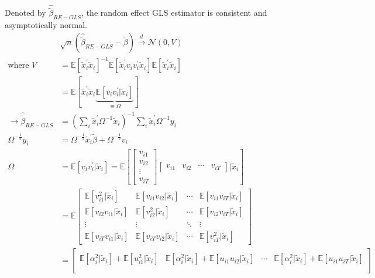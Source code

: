 Denoted by $\hat{\tilde{\beta}}_{RE-GLS} $, the random effect GLS estimator is consistent and asymptotically normal.
\begin{align*}
    &\sqrt{n} \left( \hat{\tilde{\beta}}_{RE-GLS} - \tilde{\beta} \right) \overset{d}{\rightarrow} \mathcal{N}\left(0, V \right) \\
    \text{where } V &= \mathbb{E}\left[\tilde{x}_i^{\prime} \tilde{x}_i \right]^{-1} \mathbb{E}\left[\tilde{x}_i^{\prime} v_i v_i^{\prime} \tilde{x}_i \right] \mathbb{E}\left[\tilde{x}_i^{\prime} \tilde{x}_i \right] \\
    &= \mathbb{E}\left[\tilde{x}_i^{\prime} \tilde{x}_i \underset{\equiv \Omega}{\underbrace{\mathbb{E}[v_i v_i^{\prime} | \tilde{x}_i]}}\right] \\
    \rightarrow \hat{\tilde{\beta}}_{RE-GLS} &= \left( \sum_i \tilde{x}_i^{\prime} \Omega^{-1} \tilde{x}_i \right)^{-1} \sum_i \tilde{x}_i^{\prime} \Omega^{-1} y_i \\
    \Omega ^{-\frac{1}{2}} y_i &= \Omega ^{-\frac{1}{2}} \tilde{x}_i^{\prime} \tilde{\beta} + \Omega^{-\frac{1}{2}}v_i \\
    \Omega &= \mathbb{E}[v_i v_i^{\prime} | \tilde{x}_i] = \mathbb{E}\left[ \begin{bmatrix}
        v_{i1} \\
        v_{i2} \\
        \vdots \\
        v_{iT}
    \end{bmatrix} \begin{bmatrix}
        v_{i1} & v_{i2} & \cdots & v_{iT}
    \end{bmatrix} | \tilde{x}_i \right]\\
    &= \mathbb{E}\begin{bmatrix}
        \mathbb{E}[v_{i1}^2 | \tilde{x}_i] & \mathbb{E}[v_{i1}v_{i2} | \tilde{x}_i] & \cdots & \mathbb{E}[v_{i1}v_{iT} | \tilde{x}_i] \\
        \mathbb{E}[v_{i2}v_{i1} | \tilde{x}_i] & \mathbb{E}[v_{i2}^2 | \tilde{x}_i] & \cdots & \mathbb{E}[v_{i2}v_{iT} | \tilde{x}_i] \\
        \vdots & \vdots & \ddots & \vdots \\
        \mathbb{E}[v_{iT}v_{i1} | \tilde{x}_i] & \mathbb{E}[v_{iT}v_{i2} | \tilde{x}_i] & \cdots & \mathbb{E}[v_{iT}^2 | \tilde{x}_i]
    \end{bmatrix} \\
    &= \begin{bmatrix}
        \mathbb{E}\left[\alpha_i^2 | \tilde{x}_i \right] + \mathbb{E}[u_{i1}^2 | \tilde{x}_i] & \mathbb{E}\left[\alpha_i^2 | \tilde{x}_i \right] + \mathbb{E}[u_{i1}u_{i2} | \tilde{x}_i] & \cdots & \mathbb{E}\left[\alpha_i^2 | \tilde{x}_i \right] + \mathbb{E}[u_{i1}u_{iT} | \tilde{x}_i] \\

\end{bmatrix}
\end{align*}
